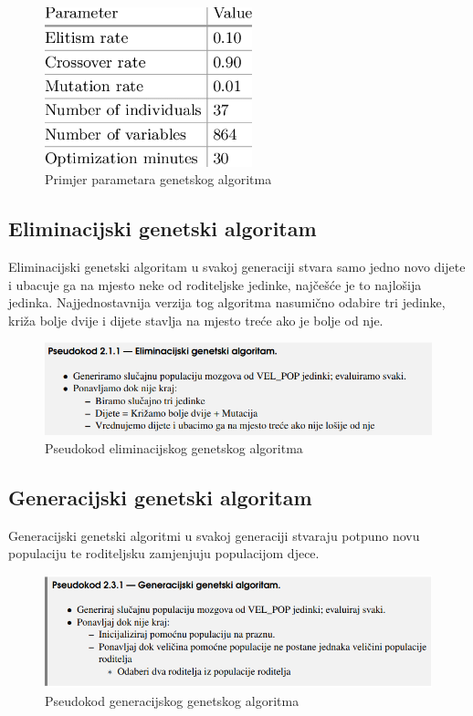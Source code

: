 \documentclass[times, utf8, zavrsni]{fer}
\begin{document}
	
	\begin{figure}[!htb]
		\centering
		\includegraphics[width=6cm]{slike/genAlgParams.png}
		\caption{Primjer parametara genetskog algoritma}
		\label{fig:gen-params}
		
	\end{figure}
	
	
	\subsection{Eliminacijski genetski algoritam}
	
	Eliminacijski genetski algoritam u svakoj generaciji stvara samo jedno novo dijete i ubacuje ga na mjesto neke od roditeljske jedinke, najčešće je to najlošija jedinka. Najjednostavnija verzija tog algoritma nasumično odabire tri jedinke, križa bolje dvije i dijete stavlja na mjesto treće ako je bolje od nje.
	
	\begin{figure}[!htb]
		\centering
		\includegraphics[width=15cm]{slike/elimGenAlg.png}
		\caption{Pseudokod eliminacijskog genetskog algoritma}
		\label{fig:elim-gen-alg}
	\end{figure}
	
	\subsection{Generacijski genetski algoritam}
	
	Generacijski genetski algoritmi u svakoj generaciji stvaraju potpuno novu populaciju te roditeljsku zamjenjuju populacijom djece. 
	
	
	\begin{figure}[htb]
		\centering
		\includegraphics[width=15cm]{slike/genGenAlg.png}
		\caption{Pseudokod generacijskog genetskog algoritma}
		\label{fig:gen-gen-alg}
	\end{figure}
	
\end{document}

